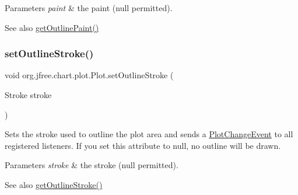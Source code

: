 \begin{DoxyParams}{Parameters}
{\em paint} & the paint ({\ttfamily null} permitted).\\
\hline
\end{DoxyParams}
\begin{DoxySeeAlso}{See also}
\mbox{\hyperlink{classorg_1_1jfree_1_1chart_1_1plot_1_1_plot_a003c8c8187f26e68a01b9f35db79a556}{get\+Outline\+Paint()}} 
\end{DoxySeeAlso}
\mbox{\label{classorg_1_1jfree_1_1chart_1_1plot_1_1_plot_a5deedaa7421aebeefe7ac0cfb77b37fb}} 
\subsubsection{\texorpdfstring{set\+Outline\+Stroke()}{setOutlineStroke()}}
{\footnotesize\ttfamily void org.\+jfree.\+chart.\+plot.\+Plot.\+set\+Outline\+Stroke (\begin{DoxyParamCaption}\item[{Stroke}]{stroke }\end{DoxyParamCaption})}

Sets the stroke used to outline the plot area and sends a \mbox{\hyperlink{}{Plot\+Change\+Event}} to all registered listeners. If you set this attribute to {\ttfamily null}, no outline will be drawn.


\begin{DoxyParams}{Parameters}
{\em stroke} & the stroke ({\ttfamily null} permitted).\\
\hline
\end{DoxyParams}
\begin{DoxySeeAlso}{See also}
\mbox{\hyperlink{classorg_1_1jfree_1_1chart_1_1plot_1_1_plot_ad2bb94f76f8470681c1b3c41c388deb8}{get\+Outline\+Stroke()}} 
\end{DoxySeeAlso}
\mbox{\label{classorg_1_1jfree_1_1chart_1_1plot_1_1_plot_a999872809bfd7cffd4731cb1b7439826}} 
